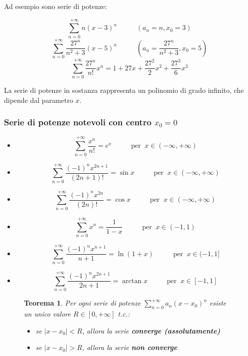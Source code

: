 \documentclass[a4paper]{article}
\newtheorem{theorem}{Teorema}
\theoremstyle{break}
\theoremstyle{break}
\theoremstyle{break}
\theoremstyle{break}
\begin{document}
Ad esempio sono serie di potenze:
\begin{figure}[H]
  \begin{example}
    \[
      \sum_{n=0}^{+\infty} n(x-3)^n \;\;\;\;\;\;\;\;\;\; (a_n=n, x_0=3)
    \] 
    \[
      \sum_{n=0}^{+\infty} \frac{27^n}{n^2+3}(x-5)^n \;\;\;\;\;\;\;\;\;\; (a_n = \frac{27^n}{n^2+3}, x_0=5)
    \] 
    \[
      \sum_{n=0}^{+\infty} \frac{27^n}{n!}x^n = 1+27x+\frac{27^2}{2}x^2+\frac{27^3}{6}x^3
    \] 
  \end{example}
\end{figure}
La serie di potenze in sostanza rappresenta un polinomio di grado infinito, che dipende dal parametro \( x \).
\subsubsection{Serie di potenze notevoli con centro \texorpdfstring{\( x_0 = 0 \)}{x\_0 = 0}}
\begin{itemize}
  \item \[
      \sum_{n=0}^{+\infty} \frac{x^n}{n!} = e^x \;\;\;\;\;\;\;\;\;\; \text{per}\;\; x \in (-\infty, +\infty)
    \] 
  \item \[
      \sum_{n=0}^{+\infty} \frac{(-1)^nx^{2n+1}}{(2n+1)!} = \sin x \;\;\;\;\;\;\;\;\;\; \text{per}\;\; x \in (-\infty, +\infty)
    \] 
  \item \[
      \sum_{n=0}^{+\infty} \frac{(-1)^nx^{2n}}{(2n)!} = \cos x \;\;\;\;\;\;\;\;\;\; \text{per}\;\; x \in (-\infty, +\infty)
    \] 
  \item \[
      \sum_{n=0}^{+\infty} x^n = \frac{1}{1-x} \;\;\;\;\;\;\;\;\;\; \text{per}\;\; x \in (-1, 1)
    \] 
  \item \[
      \sum_{n=0}^{+\infty} \frac{(-1)^nx^{n+1}}{n+1} = \ln(1+x) \;\;\;\;\;\;\;\;\;\; \text{per}\;\; x \in (-1, 1]
    \] 
  \item \[
      \sum_{n=0}^{+\infty} \frac{(-1)^n x^{2n+1}}{2n+1} = \arctan x \;\;\;\;\;\;\;\;\;\; \text{per}\;\; x \in [-1, 1]
    \] 
\end{itemize}
\begin{figure}[H]
  \begin{theorem}
    Per ogni serie di potenze \( \sum_{n=0}^{+\infty} a_n(x-x_0)^n \) esiste un unico valore \( R \in [0, +\infty] \) t.c.:
    \begin{itemize}
      \item se \( |x-x_0| < R \), allora la serie \textbf{converge (assolutamente)}
      \item se \( |x-x_0| > R \), allora la serie \textbf{non converge}
    \end{itemize}
    \label{D2}
    \label{Teorema del raggio di convergenza}
  \end{theorem}
\end{figure}
\end{document}
